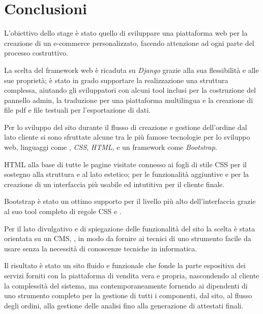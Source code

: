 \chapter*{Conclusioni} 
\label{chp:conclusioni}

L'obiettivo dello stage è stato quello di sviluppare una piattaforma web per la creazione di un e-commerce personalizzato, facendo attenzione ad ogni parte del processo costruttivo.

La scelta del framework web è ricaduta su \emph{Django} grazie alla sua flessibilità e alle sue proprietà; è stato in grado supportare la realizzazione una struttura complessa, aiutando gli sviluppatori con alcuni tool inclusi per la costruzione del pannello admin, la traduzione per una piattaforma multilingua e la creazione di file pdf e file testuali per l'esportazione di dati.

Per lo sviluppo del sito durante il flusso di creazione e gestione dell'ordine dal lato cliente si sono sfruttate alcune tra le più famose tecnologie per lo sviluppo web, linguaggi come \emph{{\js}}, \emph{CSS}, \emph{HTML}, e un framework come \emph{Bootstrap}.

HTML alla base di tutte le pagine visitate connesso ai fogli di stile CSS per il sostegno alla struttura e al lato estetico; {\js} per le funzionalità aggiuntive e per la creazione di un interfaccia più usabile ed intutitiva per il cliente finale.

Bootstrap è stato un ottimo supporto per il livello più alto dell'interfaccia grazie al suo tool completo di regole CSS e {\js}.

Per il lato divulgativo e di spiegazione delle funzionalità del sito la scelta è stata orientata su un CMS, {\wp}, in modo da fornire ai tecnici di {\fem} uno strumento facile da usare senza la necessità di conoscenze tecniche in informatica.

Il risultato è stato un sito fluido e funzionale che fonde la parte espositiva dei servizi forniti con la piattaforma di vendita vera e propria, nascondendo al cliente la complessità del sistema, ma contemporaneamente fornendo ai dipendenti di {\fem} uno strumento completo per la gestione di tutti i componenti, dal sito, al flusso degli ordini, alla gestione delle analisi fino alla generazione di attestati finali.